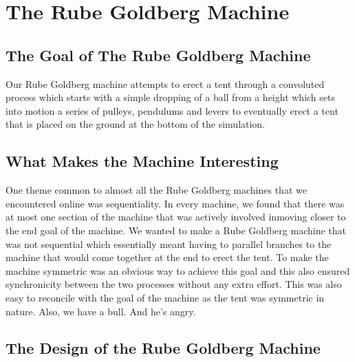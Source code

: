 \documentclass[11pt] {article}
\begin{document}
\newpage

\section {The Rube Goldberg Machine}

\subsection {The Goal of The Rube Goldberg Machine}

Our Rube Goldberg machine attempts to erect a tent through a convoluted process which starts with a simple dropping
of a ball from a height which sets into motion a series of pulleys, pendulums and levers to eventually erect a tent
that is placed on the ground at the bottom of the simulation. 

\subsection {What Makes the Machine Interesting}

One theme common to almost all the Rube Goldberg machines that we encountered online was sequentiality. In every 
machine, we found that there was at most one section of the machine that was actively involved inmoving closer 
to the end goal of the machine. We wanted to make a Rube Goldberg machine that was not sequential which 
essentially meant having to parallel branches to the machine that would come together at the end to erect the
tent. To make the machine symmetric was an obvious way to achieve this goal and this also ensured synchronicity 
between the two processes without any extra effort. This was also easy to reconcile with the goal of the machine
as the tent was symmetric in nature. Also, we have a bull. And he's angry.

\subsection {The Design of the Rube Goldberg Machine}
\end{document}

